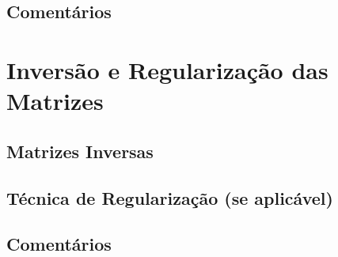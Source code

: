 \documentclass[a4paper, 12pt]{article}
\begin{document}
\subsection{Comentários}


\section{Inversão e Regularização das Matrizes}


\subsection{Matrizes Inversas}


\subsection{Técnica de Regularização (se aplicável)}


\subsection{Comentários}
\end{document}
